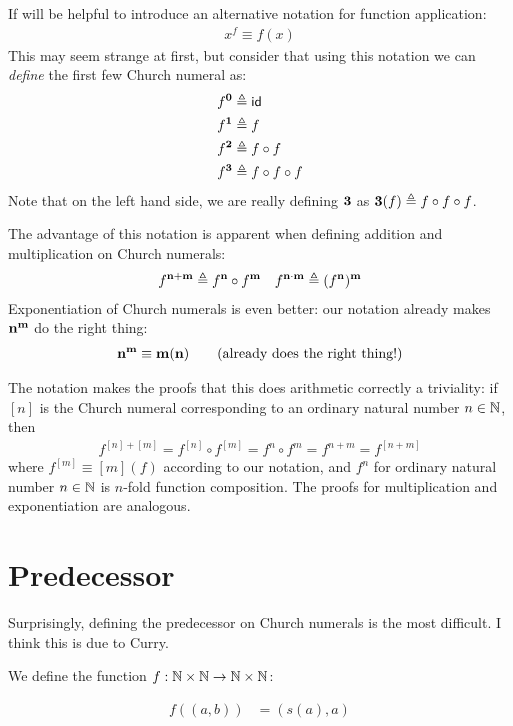 If will be helpful to introduce an alternative notation for function application:
\begin{align*}
  x^f \equiv f(x)
\end{align*}
This may seem strange at first, but consider that using this notation we can \emph{define} the first few Church numeral as:
\begin{align*}
  f^{\mathbf{0}} &\triangleq{} \mathsf{id}\\
  f^{\mathbf{1}} &\triangleq{} f \\
  f^{\mathbf{2}} &\triangleq{} f \circ f\\
  f^{\mathbf{3}} &\triangleq{} f \circ f \circ f
\end{align*}
Note that on the left hand side, we are really defining $\mathbf{3}$ as $\mathbf{3}(f) \triangleq{} f \circ f \circ f$.

The advantage of this notation is apparent when defining addition and multiplication on Church numerals:
\begin{align*}
  f^{\mathbf{n}+\mathbf{m}} \triangleq{} f^{\mathbf{n}} \circ f^{\mathbf{m}} &&
  f^{\mathbf{n}\cdot\mathbf{m}} \triangleq{} (f^{\mathbf{n}})^{\mathbf{m}}
\end{align*}
Exponentiation of Church numerals is even better: our notation already makes $\mathbf{n}^{\mathbf{m}}$ do the right thing:
\begin{align*}
  \mathbf{n}^{\mathbf{m}} \equiv \mathbf{m}(\mathbf{n}) \tag{already does the right thing!}
\end{align*}

The notation makes the proofs that this does arithmetic correctly a triviality: if $[n]$ is the Church numeral corresponding to an ordinary natural number $n \in \mathbb{N}$, then
\begin{align*}
  f^{[n]+[m]} = f^{[n]} \circ f^{[m]} = f^n \circ f^m = f^{n+m} = f^{[n+m]}
\end{align*}
where $f^{[m]} \equiv [m](f)$ according to our notation, and $f^n$ for ordinary natural number $n \in \mathbb{N}$ is $n$-fold function composition.
The proofs for multiplication and exponentiation are analogous.

\section*{Predecessor}
Surprisingly, defining the predecessor on Church numerals is the most difficult. I think this is due to Curry.

We define the function $f : \mathbb{N} \times \mathbb{N} \to \mathbb{N} \times \mathbb{N}$:

\begin{align*}
  f((a,b)) &= (s(a),a)
\end{align*}

